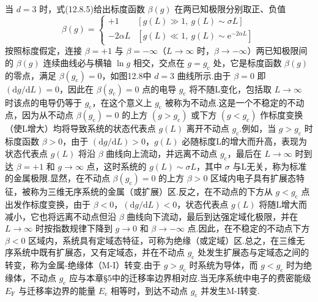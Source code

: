当 $d=3$ 时，式(12.8.5)给出标度函数 $\beta\left(g\right)$ 在两已知极限分别取正、负值
\begin{equation}
  \beta\left(g\right)=
  \begin{cases}
    +1 & \left[g\left(L\right)\gg1,\ g\left(L\right)\sim\sigma L\right]\\
    -2\alpha L & \left[g\left(L\right)\ll1,\ g\left(L\right)\sim\mathrm{e}^{-2\alpha L}\right]
  \end{cases}
\end{equation}
按照标度假定，连接 $\beta=+1$ 与 $\beta=-\infty$（$L\rightarrow\infty$ 时，$\beta\rightarrow-\infty$）两已知极限间的 $\beta\left(g\right)$ 连续曲线必与横轴 $\ln g$ 相交，交点在 $g=g_{\mathrm{c}}$ 处，它是标度函数 $\beta\left(g\right)$ 的零点，满足 $\beta\left(g_{\mathrm{c}}\right)=0$，如图12.8中 $d=3$ 曲线所示.由于 $\beta=0$ 即 $\left(\mathrm{d}g/\mathrm{d}L\right)=0$，因此在 $\beta\left(g_{\mathrm{c}}\right)=0$ 点的电导 $g_{\mathrm{c}}$ 将不随L变化，包括取 $L\rightarrow\infty$ 时该点的电导仍等于 $g_{\mathrm{c}}$，在这个意义上 $g_{\mathrm{c}}$ 被称为不动点.这是一个不稳定的不动点，因为从不动点 $\beta\left(g_{\mathrm{c}}\right)=0$ 的上方 $\left(g>g_{\mathrm{c}}\right)$ 或下方 $\left(g<g_{\mathrm{c}}\right)$ 作标度变换（使L增大）均将导致系统的状态代表点 $g\left(L\right)$ 离开不动点 $g_{\mathrm{c}}$.例如，当 $g>g_{\mathrm{c}}$ 时标度函数 $\beta>0$，由于 $\left(\mathrm{d}g/\mathrm{d}L\right)>0$，$g\left(L\right)$ 必随标度L的增大而升高，表现为状态代表点 $g\left(L\right)$ 将沿 $\beta$ 曲线向上流动，并远离不动点 $g_{\mathrm{c}}$，最后在 $L\rightarrow\infty$ 时到达 $\beta=+1$ 和 $g\rightarrow\infty$ 点，这时系统的 $g\left(L\right)\sim\sigma L$，其中 $\sigma$ 与L无关，称为标准的金属极限.显然，在不动点 $\beta\left(g_{\mathrm{c}}\right)=0$ 的上方 $\beta>0$ 区域内电子具有扩展态特征，被称为三维无序系统的金属（或扩展）区.反之，在不动点的下方从 $g<g_{\mathrm{c}}$ 点出发作标度变换，由于 $\beta<0$，$\left(\mathrm{d}g/\mathrm{d}L\right)<0$，状态代表点 $g\left(L\right)$ 将随L增大而减小，它也将远离不动点但沿 $\beta$ 曲线向下流动，最后到达强定域化极限，并在 $L\rightarrow\infty$ 时按指数规律下降到 $g\rightarrow0$ 和 $\beta\rightarrow-\infty$ 点.因此，在不稳定的不动点下方 $\beta<0$ 区域内，系统具有定域态特征，可称为绝缘（或定域）区.总之，在三维无序系统中既有扩展态，又有定域态，并在不动点 $g_{\mathrm{c}}$ 处发生扩展态与定域态之间的转变，称为金属-绝缘体（M-I）转变.由于 $g>g_{\mathrm{c}}$ 时系统为导体，而 $g<g_{\mathrm{c}}$ 时为绝缘体，不动点 $g_{\mathrm{c}}$ 应与本章§5中的迁移率边界相对应.当无序系统中电子的费密能级 $E_{\mathrm{F}}$ 与迁移率边界的能量 $E_{\mathrm{c}}$ 相等时，到达不动点 $g_{\mathrm{c}}$ 并发生M-I转变.

